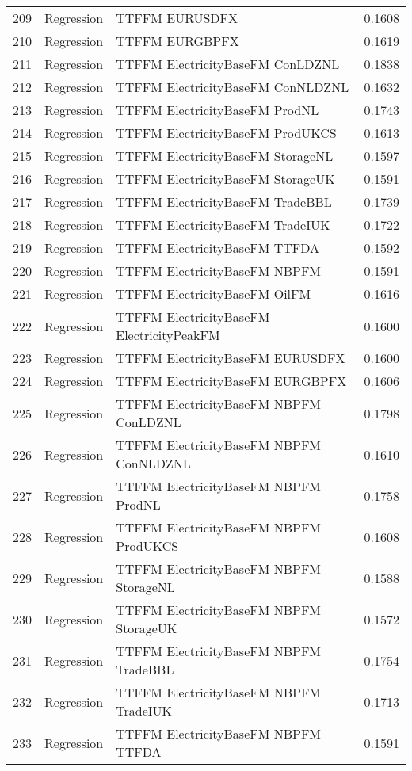 \begin{table}[ht]
\begin{tabular}{rllr}
  209 & Regression & TTFFM EURUSDFX & 0.1608 \\ 
  210 & Regression & TTFFM EURGBPFX & 0.1619 \\ 
  211 & Regression & TTFFM ElectricityBaseFM ConLDZNL & 0.1838 \\ 
  212 & Regression & TTFFM ElectricityBaseFM ConNLDZNL & 0.1632 \\ 
  213 & Regression & TTFFM ElectricityBaseFM ProdNL & 0.1743 \\ 
  214 & Regression & TTFFM ElectricityBaseFM ProdUKCS & 0.1613 \\ 
  215 & Regression & TTFFM ElectricityBaseFM StorageNL & 0.1597 \\ 
  216 & Regression & TTFFM ElectricityBaseFM StorageUK & 0.1591 \\ 
  217 & Regression & TTFFM ElectricityBaseFM TradeBBL & 0.1739 \\ 
  218 & Regression & TTFFM ElectricityBaseFM TradeIUK & 0.1722 \\ 
  219 & Regression & TTFFM ElectricityBaseFM TTFDA & 0.1592 \\ 
  220 & Regression & TTFFM ElectricityBaseFM NBPFM & 0.1591 \\ 
  221 & Regression & TTFFM ElectricityBaseFM OilFM & 0.1616 \\ 
  222 & Regression & TTFFM ElectricityBaseFM ElectricityPeakFM & 0.1600 \\ 
  223 & Regression & TTFFM ElectricityBaseFM EURUSDFX & 0.1600 \\ 
  224 & Regression & TTFFM ElectricityBaseFM EURGBPFX & 0.1606 \\ 
  225 & Regression & TTFFM ElectricityBaseFM NBPFM ConLDZNL & 0.1798 \\ 
  226 & Regression & TTFFM ElectricityBaseFM NBPFM ConNLDZNL & 0.1610 \\ 
  227 & Regression & TTFFM ElectricityBaseFM NBPFM ProdNL & 0.1758 \\ 
  228 & Regression & TTFFM ElectricityBaseFM NBPFM ProdUKCS & 0.1608 \\ 
  229 & Regression & TTFFM ElectricityBaseFM NBPFM StorageNL & 0.1588 \\ 
  230 & Regression & TTFFM ElectricityBaseFM NBPFM StorageUK & 0.1572 \\ 
  231 & Regression & TTFFM ElectricityBaseFM NBPFM TradeBBL & 0.1754 \\ 
  232 & Regression & TTFFM ElectricityBaseFM NBPFM TradeIUK & 0.1713 \\ 
  233 & Regression & TTFFM ElectricityBaseFM NBPFM TTFDA & 0.1591 \\ 

\end{tabular}
\end{table}
